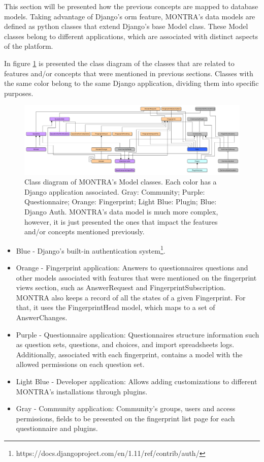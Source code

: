 This section will be presented how the previous concepts are mapped to database models.
Taking advantage of Django's \gls{orm} feature, MONTRA's data models are defined as python classes that extend Django's base Model class.
These Model classes belong to different applications, which are associated with distinct aspects of the platform.

In figure \ref{fig:old-models} is presented the class diagram of the classes that are related to features and/or concepts that were mentioned in previous sections.
Classes with the same color belong to the same Django application, dividing them into specific purposes.

\begin{figure}[h]
    \includegraphics[width=\textwidth]{old-models}
    \caption{Class diagram of MONTRA's Model classes. Each color has a Django application associated. Gray: Community; Purple: Questionnaire; Orange: Fingerprint; Light Blue: Plugin; Blue: Django Auth. MONTRA's data model is much more complex, however, it is just presented the ones that impact the features and/or concepts mentioned previously.}
    \label{fig:old-models}
\end{figure}

\begin{itemize}
    \item Blue - Django's built-in authentication system\footnote{https://docs.djangoproject.com/en/1.11/ref/contrib/auth/}.
    \item Orange - Fingerprint application: Answers to questionnaires questions and other models associated with features that were mentioned on the fingerprint views section, such as AnswerRequest and FingerprintSubscription.
        MONTRA also keeps a record of all the states of a given Fingerprint.
        For that, it uses the FingerprintHead model, which maps to a set of AnswerChanges.
    \item Purple - Questionnaire application: Questionnaires structure information such as question sets, questions, and choices, and import spreadsheets logs. Additionally, associated with each fingerprint, contains a model with the allowed permissions on each question set.
    \item Light Blue - Developer application: Allows adding customizations to different MONTRA's installations through plugins.
    \item Gray - Community application: Community's groups, users and access permissions, fields to be presented on the fingerprint list page for each questionnaire and plugins.
\end{itemize}

